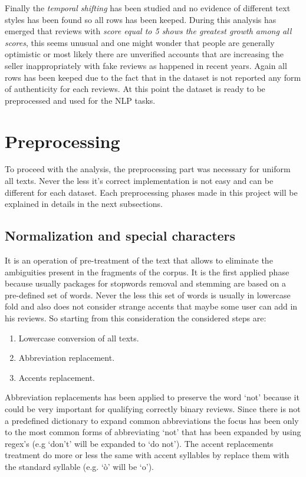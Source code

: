 \documentclass[11pt]{article}
\begin{document}
\noindent Finally the \textit{temporal shifting} has been studied and no evidence of different text styles has been found so all rows has been keeped. During this analysis has emerged that reviews with \textit{score equal to 5 shows the greatest growth among all scores}, this seems unusual and one might wonder that people are generally optimistic or most likely there are unverified accounts that are increasing the seller inappropriately with fake reviews as happened in recent years. Again all rows has been keeped due to the fact that in the dataset is not reported any form of authenticity for each reviews. At this point the dataset is ready to be preprocessed and used for the NLP tasks.

\section{Preprocessing}
To proceed with the analysis, the preprocessing part was necessary for uniform all texts. Never the less it's correct implementation is not easy and can be different for each dataset. Each preprocessing phases made in this project will be explained in details in the next subsections.

\subsection{Normalization and special characters}
It is an operation of pre-treatment of the text that allows to eliminate the ambiguities present in the fragments of the corpus. It is the first applied phase because usually packages for stopwords removal and stemming are based on a pre-defined set of words. Never the less this set of words is usually in lowercase fold and also does not consider strange accents that maybe some user can add in his reviews. 
So starting from this consideration the considered steps are:
\begin{enumerate}
    \item Lowercase conversion of all texts.
    \item Abbreviation replacement.
    \item Accents replacement.
\end{enumerate}
Abbreviation replacements has been applied to preserve the word `not' because it could be very important for qualifying correctly binary reviews. Since there is not a predefined dictionary to expand common abbreviations the focus has been only to the most common forms of abbreviating `not' that has been expanded by using regex's (e.g `don't' will be expanded to `do not'). The accent replacements treatment do more or less the same with accent syllables by replace them with the standard syllable (e.g. `ò' will be `o').
\end{document}

